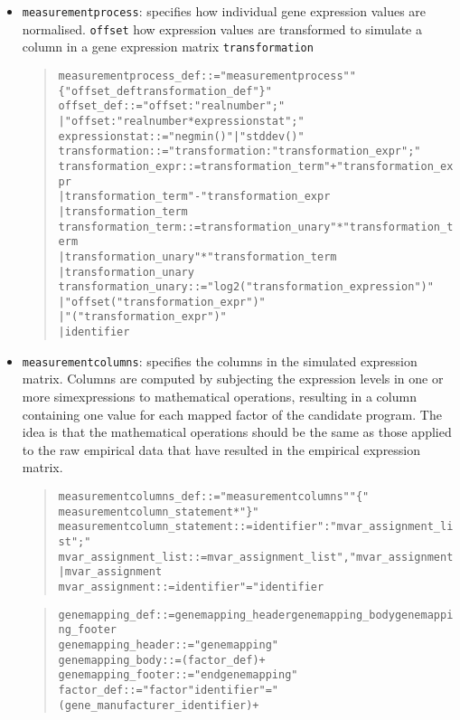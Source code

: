 \documentclass[a4paper,fleqn]{article}
\newcommand{\computercode}[1]{\texttt{#1}}
\newenvironment{ebnfrule}{\begin{footnotesize}\begin{quote}\begin{alltt}}{\end{alltt}\end{quote}\end{footnotesize}}
\begin{document}
\begin{itemize}
\item\computercode {measurementprocess}: specifies how individual gene
  expression values are normalised. \computercode{offset} how
  expression values are transformed to simulate a column in a gene
  expression matrix \computercode{transformation}

\begin{ebnfrule}

measurementprocess_def ::= "measurementprocess" "\{" offset_def transformation_def "\}"
offset_def ::= "offset:" realnumber ";"
        | "offset:" realnumber * expressionstat ";"
expressionstat ::= "negmin()" | "stddev()"
transformation ::= "transformation:" transformation_expr ";"
transformation_expr ::= transformation_term "+" transformation_expr
        | transformation_term "-" transformation_expr
        | transformation_term
transformation_term ::= transformation_unary "*" transformation_term
        | transformation_unary "*" transformation_term
        | transformation_unary
transformation_unary ::= "log2(" transformation_expression ")"
        | "offset(" transformation_expr ")"
        | "(" transformation_expr ")"
        | identifier

\end{ebnfrule}

\item \computercode{measurementcolumns}: specifies the columns in the
  simulated expression matrix. Columns are computed by subjecting the
  expression levels in one or more simexpressions to mathematical
  operations, resulting in a column containing one value for each
  mapped factor of the candidate program. The idea is that the
  mathematical operations should be the same as those applied to the
  raw empirical data that have resulted in the empirical expression
  matrix.

\begin{ebnfrule}
measurementcolumns_def ::=  "measurementcolumns" "\{" 
measurementcolumn_statement* "\}"
measurementcolumn_statement ::= identifier ":" mvar_assignment_list ";"
mvar_assignment_list ::= mvar_assignment_list "," mvar_assignment
        | mvar_assignment
mvar_assignment ::= identifier "=" identifier
\end{ebnfrule}

\begin{ebnfrule}
genemapping_def ::= genemapping_header genemapping_body genemapping_footer 
genemapping_header ::= "genemapping" 
genemapping_body ::= (factor_def )+   
genemapping_footer ::= "endgenemapping"  
factor_def ::= "factor" identifier "=" (gene_manufacturer_identifier)+ 
\end{ebnfrule}


\end{itemize}
\end{document}
